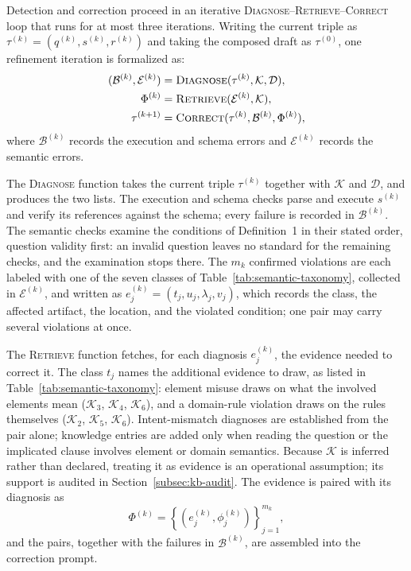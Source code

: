 \documentclass[letterpaper,journal]{IEEEtran}
\begin{document}
Detection and correction proceed in an iterative \textsc{Diagnose}--\textsc{Retrieve}--\textsc{Correct} loop that runs for at most three iterations. Writing the current triple as $\tau^{(k)}=(q^{(k)},s^{(k)},r^{(k)})$ and taking the composed draft as $\tau^{(0)}$, one refinement iteration is formalized as:
\begin{equation}
\label{eq:refinement}
\begin{aligned}
(\mathcal{B}^{(k)},\mathcal{E}^{(k)}) &= \textsc{Diagnose}(\tau^{(k)},\mathcal{K},\mathcal{D}), \\
\Phi^{(k)} &= \textsc{Retrieve}(\mathcal{E}^{(k)},\mathcal{K}), \\
\tau^{(k+1)} &= \textsc{Correct}(\tau^{(k)},\mathcal{B}^{(k)},\Phi^{(k)}),
\end{aligned}
\end{equation}
where $\mathcal{B}^{(k)}$ records the execution and schema errors and $\mathcal{E}^{(k)}$ records the semantic errors.

The \textsc{Diagnose} function takes the current triple $\tau^{(k)}$ together with $\mathcal{K}$ and $\mathcal{D}$, and produces the two lists. The execution and schema checks parse and execute $s^{(k)}$ and verify its references against the schema; every failure is recorded in $\mathcal{B}^{(k)}$. The semantic checks examine the conditions of Definition~1 in their stated order, question validity first: an invalid question leaves no standard for the remaining checks, and the examination stops there. The $m_k$ confirmed violations are each labeled with one of the seven classes of Table~\ref{tab:semantic-taxonomy}, collected in $\mathcal{E}^{(k)}$, and written as $e_j^{(k)}=(t_j,u_j,\lambda_j,v_j)$, which records the class, the affected artifact, the location, and the violated condition; one pair may carry several violations at once.

The \textsc{Retrieve} function fetches, for each diagnosis $e_j^{(k)}$, the evidence needed to correct it. The class $t_j$ names the additional evidence to draw, as listed in Table~\ref{tab:semantic-taxonomy}: element misuse draws on what the involved elements mean ($\mathcal{K}_3$, $\mathcal{K}_4$, $\mathcal{K}_6$), and a domain-rule violation draws on the rules themselves ($\mathcal{K}_2$, $\mathcal{K}_5$, $\mathcal{K}_6$). Intent-mismatch diagnoses are established from the pair alone; knowledge entries are added only when reading the question or the implicated clause involves element or domain semantics. Because $\mathcal{K}$ is inferred rather than declared, treating it as evidence is an operational assumption; its support is audited in Section~\ref{subsec:kb-audit}. The evidence is paired with its diagnosis as
\begin{equation}
\label{eq:evidence-retrieval}
\Phi^{(k)}=\left\{\left(e_j^{(k)},\phi_j^{(k)}\right)\right\}_{j=1}^{m_k},
\end{equation}
and the pairs, together with the failures in $\mathcal{B}^{(k)}$, are assembled into the correction prompt.
\end{document}
